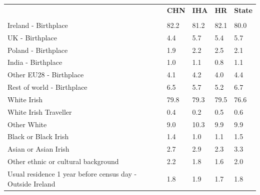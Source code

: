 \documentclass{article}
\begin{document}
\pagebreak
\begin{table}[h]	
\centering
		\begin{tabular}{KTTTT}
  \hline
& \textbf{CHN} & \textbf{IHA} & \textbf{HR}& \textbf{State}\\ 
  \hline
    \\ 
    \hline
Ireland - Birthplace & 82.2& 81.2& 82.1& 80.0\\
UK - Birthplace & 4.4& 5.7& 5.4& 5.7\\
Poland - Birthplace & 1.9& 2.2& 2.5& 2.1\\
India - Birthplace & 1.0& 1.1& 0.8& 1.1\\
Other EU28 - Birthplace & 4.1& 4.2& 4.0& 4.4\\
Rest of world - Birthplace & 6.5& 5.7& 5.2& 6.7\\
    \hline
White Irish & 79.8& 79.3& 79.5& 76.6\\
White Irish Traveller & 0.4& 0.2& 0.5& 0.6\\
Other White &  9.0& 10.3&  9.9&  9.9\\
Black or Black Irish & 1.4& 1.0& 1.1& 1.5\\
Asian or Asian Irish & 2.7& 2.9& 2.3& 3.3\\
Other ethnic or cultural background & 2.2& 1.8& 1.6& 2.0\\
    \hline
Usual residence 1 year before census day - Outside Ireland & 1.8& 1.9& 1.7& 1.8\\


\end{tabular}
\end{table}
\end{document}
